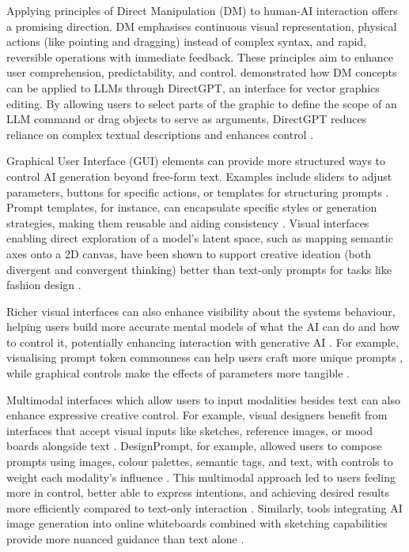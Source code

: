 Applying principles of Direct Manipulation (DM) \citep{Shneiderman1997-pu, Shneiderman1997-tv} to human-AI interaction offers a promising direction. DM emphasises continuous visual representation, physical actions (like pointing and dragging) instead of complex syntax, and rapid, reversible operations with immediate feedback. These principles aim to enhance user comprehension, predictability, and control. \citet{Masson2024-nt} demonstrated how DM concepts can be applied to LLMs through DirectGPT, an interface for vector graphics editing. By allowing users to select parts of the graphic to define the scope of an LLM command or drag objects to serve as arguments, DirectGPT reduces reliance on complex textual descriptions and enhances control \citep{Masson2024-nt}. 

Graphical User Interface (GUI) elements can provide more structured ways to control AI generation beyond free-form text. Examples include sliders to adjust parameters, buttons for specific actions, or templates for structuring prompts \citep{Ding2024-ta, Chang2023-tv, Moruzzi2024-cq}. Prompt templates, for instance, can encapsulate specific styles or generation strategies, making them reusable and aiding consistency \citep{Chang2023-tv}. Visual interfaces enabling direct exploration of a model's latent space, such as mapping semantic axes onto a 2D canvas, have been shown to support creative ideation (both divergent and convergent thinking) better than text-only prompts for tasks like fashion design \citep{Davis2024-ml}. 

Richer visual interfaces can also enhance visibility about the systems behaviour, helping users build more accurate mental models of what the AI can do and how to control it, potentially enhancing interaction with generative AI \citep{Weisz2024-io, Amershi2019-vy}. For example, visualising prompt token commonness can help users craft more unique prompts \citep{Chang2023-tv}, while graphical controls make the effects of parameters more tangible \citep{Davis2024-ml}. 

Multimodal interfaces which allow users to input modalities besides text can also enhance expressive creative control. For example, visual designers benefit from interfaces that accept visual inputs like sketches, reference images, or mood boards alongside text \citep{Park2024-gw, Peng2024-tr}. DesignPrompt, for example, allowed users to compose prompts using images, colour palettes, semantic tags, and text, with controls to weight each modality's influence \citep{Peng2024-tr}. This multimodal approach led to users feeling more in control, better able to express intentions, and achieving desired results more efficiently compared to text-only interaction \citep{Peng2024-tr}. Similarly, tools integrating AI image generation into online whiteboards combined with sketching capabilities provide more nuanced guidance than text alone \citep{Verheijden2023-gn}.

